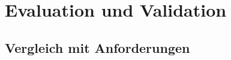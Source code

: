 \chapter{Evaluation und Validation}
\label{ch:Eval}

\section{Vergleich mit Anforderungen}
\label{sec:VergleichAnforderungen}